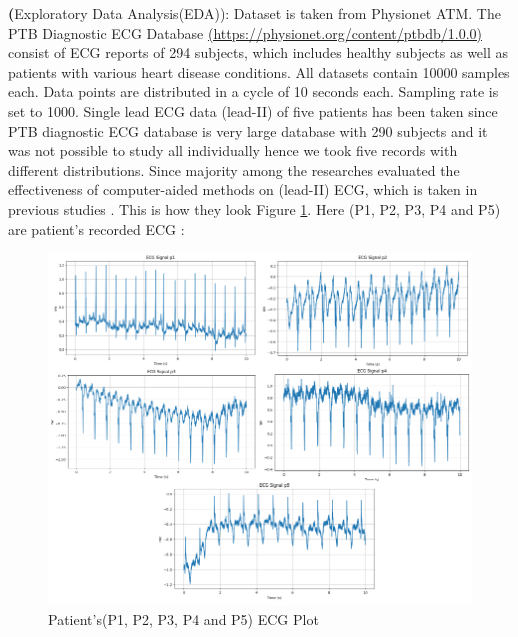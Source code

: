 \documentclass[a4paper, fleqn]{cas-sc}
\begin{document}
\textbf({Exploratory Data Analysis(EDA)}): Dataset is taken from Physionet ATM. The PTB Diagnostic ECG Database \href{https://physionet.org/content/ptbdb/1.0.0}{(https://physionet.org/content/ptbdb/1.0.0)} consist of ECG reports of 294 subjects,  which includes healthy subjects as well as patients with various heart disease conditions. All datasets contain 10000 samples each. Data points are distributed in a cycle of 10 seconds each. Sampling rate is set to 1000. Single lead ECG data (lead-{II}) of five patients has been taken since PTB diagnostic ECG database is very large database with 290 subjects and it was not possible to study all individually hence we took five records with different distributions. Since majority among the researches evaluated the effectiveness of computer-aided methods on (lead-II) ECG,  which is taken in previous studies \cite{liu2021deep}. This is how they look Figure  \ref{Fig:1}. Here (P1, P2, P3, P4 and P5) are patient's recorded ECG :
\begin{figure}[ht!]
    \centering
     \includegraphics[scale=1]{edadrawio.pdf}
     \caption{Patient's(P1,  P2,  P3,  P4 and P5) ECG Plot}
     \label{Fig:1}
   \end{figure}
\end{document}

